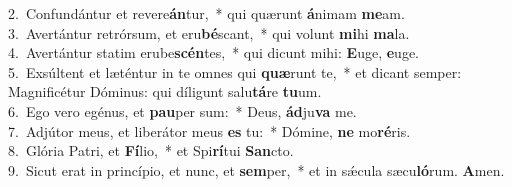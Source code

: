 {2.~}Confundántur et revere\textbf{án}tur,~* qui quærunt \textbf{á}nimam \textbf{me}am.\\
{3.~}Avertántur retrórsum, et eru\textbf{bé}scant,~* qui volunt \textbf{mi}hi \textbf{ma}la.\\
{4.~}Avertántur statim erube\textbf{scén}tes,~* qui dicunt mihi: \textbf{E}uge, \textbf{e}uge.\\
{5.~}Exsúltent et læténtur in te omnes qui \textbf{quæ}runt te,~* et dicant semper: Magnificétur Dóminus: qui díligunt salu\textbf{tá}re \textbf{tu}um.\\
{6.~}Ego vero egénus, et \textbf{pau}per sum:~* Deus, \textbf{ád}ju\textbf{va} me.\\
{7.~}Adjútor meus, et liberátor meus \textbf{es} tu:~* Dómine, \textbf{ne} mo\textbf{ré}ris.\\
{8.~}Glória Patri, et \textbf{Fí}lio,~* et Spi\textbf{rí}tui \textbf{San}cto.\\
{9.~}Sicut erat in princípio, et nunc, et \textbf{sem}per,~* et in sǽcula sæcu\textbf{ló}rum. \textbf{A}men.\\
